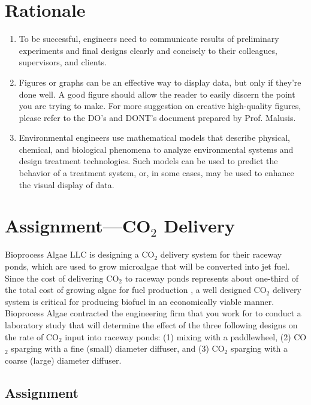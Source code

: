 \documentclass[12pt,letterpaper]{article}
\begin{document}
\section *{Rationale}
\begin{enumerate}
\item To be successful, engineers need to communicate results of preliminary experiments and final designs clearly and concisely to their colleagues, supervisors, and clients.

\item Figures or graphs can be an effective way to display data, but only if they're done well. A good figure should allow the reader to easily discern the point you are trying to make.  For more suggestion on creative high-quality figures, please refer to the DO's and DONT's document prepared by Prof. Malusis.

\item Environmental engineers use mathematical models that describe physical, chemical, and biological phenomena to analyze environmental systems and design treatment technologies.  Such models can be used to predict the behavior of a treatment system, or, in some cases, may be used to enhance the visual display of data.

\end{enumerate}
 

\section *{Assignment---CO$_2$ Delivery}

Bioprocess Algae LLC is designing a CO$_2$ delivery system for their raceway ponds, which are used to grow microalgae that will be converted into jet fuel. Since the cost of delivering CO$_2$ to raceway ponds represents about one-third of the total cost of growing algae for fuel production \cite{Lund2010}, a well designed CO$_2$ delivery system is critical for producing biofuel in an economically viable manner.\\  

Bioprocess Algae contracted the engineering firm that you work for to conduct a laboratory study that will determine the effect of the three following designs  on the rate of CO$_2$ input into raceway ponds: (1) mixing with a paddlewheel, (2) CO$_2$ sparging with a fine (small) diameter diffuser, and (3) CO$_2$ sparging with a coarse (large) diameter diffuser.

\subsection *{Assignment}
\end{document}
